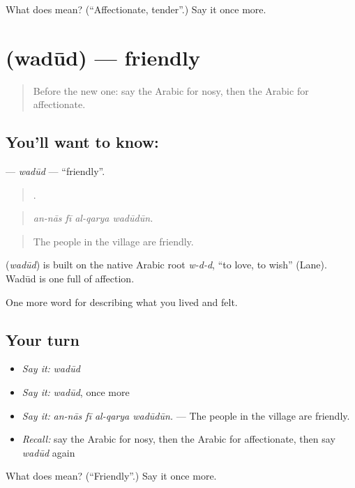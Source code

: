 \begin{tcolorbox}[breakable,colback=teal!4,colframe=teal!35!black,title={Before you move on}]
What does  mean? (\textquotedblleft{}Affectionate, tender\textquotedblright{}.) Say it once more.
\end{tcolorbox}
\section[\texorpdfstring{\ar{ودود} (wadūd)}{ودود (wadūd)}]{ (wadūd) — friendly}

\label{lesson:AR-C502-wadud}



\begin{quote}
Before the new one: say the Arabic for nosy, then the Arabic for affectionate.
\end{quote}

\subsection*{You'll want to know: }
\textbf{} — \emph{wadūd} — \textquotedblleft{}friendly\textquotedblright{}.

\begin{quote}
   .
\end{quote}

\begin{quote}
\emph{an-nās fī al-qarya wadūdūn.}
\end{quote}

\begin{quote}
The people in the village are friendly.
\end{quote}

\begin{cousinweb}
\textbf{} (\emph{wadūd}) is built on the native Arabic root \emph{w-d-d}, \textquotedblleft{}to love, to wish\textquotedblright{} (Lane). Wadūd is one full of affection.
\end{cousinweb}

\begin{grammarlens}[title={What you've built}]
One more word for describing what you lived and felt.
\end{grammarlens}

\subsection*{Your turn}
\begin{itemize}
\raggedright
  \item \emph{Say it:} \emph{wadūd}
  \item \emph{Say it:} \emph{wadūd}, once more
  \item \emph{Say it:} \emph{an-nās fī al-qarya wadūdūn.} — The people in the village are friendly.
  \item \emph{Recall:} say the Arabic for nosy, then the Arabic for affectionate, then say \emph{wadūd} again
\end{itemize}

\begin{tcolorbox}[breakable,colback=teal!4,colframe=teal!35!black,title={Before you move on}]
What does  mean? (\textquotedblleft{}Friendly\textquotedblright{}.) Say it once more.
\end{tcolorbox}
